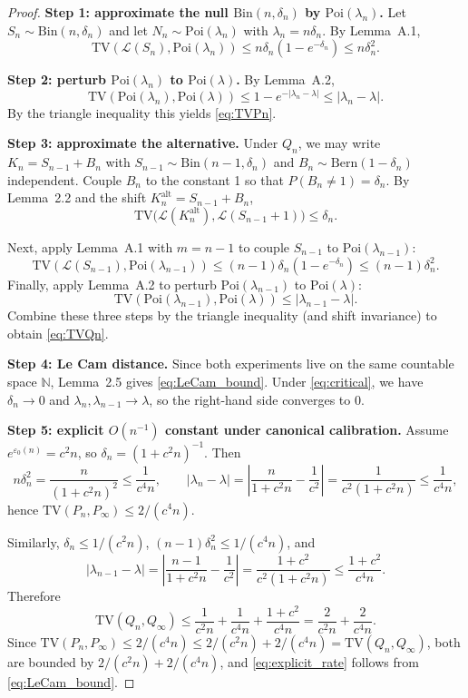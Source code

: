 \documentclass{article}
\begin{document}
\begin{proof}
\textbf{Step 1: approximate the null $\mathrm{Bin}(n, \delta_n)$ by $\mathrm{Poi}(\lambda_n)$.} Let $S_n \sim \mathrm{Bin}(n, \delta_n)$ and let
$N_n \sim \mathrm{Poi}(\lambda_n)$ with $\lambda_n = n\delta_n$. By Lemma~A.1,
\[
\mathrm{TV}(\mathcal{L}(S_n), \mathrm{Poi}(\lambda_n)) \leq n\delta_n(1 - e^{-\delta_n}) \leq n\delta_n^2.
\]

\textbf{Step 2: perturb $\mathrm{Poi}(\lambda_n)$ to $\mathrm{Poi}(\lambda)$.} By Lemma~A.2,
\[
\mathrm{TV}(\mathrm{Poi}(\lambda_n), \mathrm{Poi}(\lambda)) \leq 1 - e^{-|\lambda_n - \lambda|} \leq |\lambda_n - \lambda|.
\]
By the triangle inequality this yields \eqref{eq:TVPn}.

\textbf{Step 3: approximate the alternative.} Under $Q_n$, we may write $K_n = S_{n-1} + B_n$ with
$S_{n-1} \sim \mathrm{Bin}(n-1, \delta_n)$ and $B_n \sim \mathrm{Bern}(1 - \delta_n)$ independent. Couple $B_n$ to the constant 1 so that
$P(B_n \neq 1) = \delta_n$. By Lemma~2.2 and the shift $K_n^{\mathrm{alt}} = S_{n-1} + B_n$,
\[
\mathrm{TV}\bigl(\mathcal{L}(K_n^{\mathrm{alt}}), \mathcal{L}(S_{n-1} + 1)\bigr) \leq \delta_n.
\]

Next, apply Lemma~A.1 with $m = n-1$ to couple $S_{n-1}$ to $\mathrm{Poi}(\lambda_{n-1})$:
\[
\mathrm{TV}(\mathcal{L}(S_{n-1}), \mathrm{Poi}(\lambda_{n-1})) \leq (n-1)\delta_n(1 - e^{-\delta_n}) \leq (n-1)\delta_n^2.
\]
Finally, apply Lemma~A.2 to perturb $\mathrm{Poi}(\lambda_{n-1})$ to $\mathrm{Poi}(\lambda)$:
\[
\mathrm{TV}(\mathrm{Poi}(\lambda_{n-1}), \mathrm{Poi}(\lambda)) \leq |\lambda_{n-1} - \lambda|.
\]
Combine these three steps by the triangle inequality (and shift invariance) to obtain \eqref{eq:TVQn}.

\textbf{Step 4: Le Cam distance.} Since both experiments live on the same countable space $\mathbb{N}$,
Lemma~2.5 gives \eqref{eq:LeCam_bound}. Under \eqref{eq:critical}, we have $\delta_n \to 0$ and $\lambda_n, \lambda_{n-1} \to \lambda$, so the right-hand side
converges to 0.

\textbf{Step 5: explicit $O(n^{-1})$ constant under canonical calibration.} Assume $e^{\varepsilon_0(n)} = c^2 n$, so
$\delta_n = (1 + c^2 n)^{-1}$. Then
\[
n\delta_n^2 = \frac{n}{(1 + c^2 n)^2} \leq \frac{1}{c^4 n}, \qquad
|\lambda_n - \lambda| = \left|\frac{n}{1 + c^2 n} - \frac{1}{c^2}\right| = \frac{1}{c^2(1 + c^2 n)} \leq \frac{1}{c^4 n},
\]
hence $\mathrm{TV}(P_n, P_\infty) \leq 2/(c^4 n)$.

Similarly, $\delta_n \leq 1/(c^2 n)$, $(n-1)\delta_n^2 \leq 1/(c^4 n)$, and
\[
|\lambda_{n-1} - \lambda| = \left|\frac{n-1}{1 + c^2 n} - \frac{1}{c^2}\right| = \frac{1 + c^2}{c^2(1 + c^2 n)} \leq \frac{1 + c^2}{c^4 n}.
\]
Therefore
\[
\mathrm{TV}(Q_n, Q_\infty) \leq \frac{1}{c^2 n} + \frac{1}{c^4 n} + \frac{1 + c^2}{c^4 n} = \frac{2}{c^2 n} + \frac{2}{c^4 n}.
\]
Since $\mathrm{TV}(P_n, P_\infty) \leq 2/(c^4 n) \leq 2/(c^2 n) + 2/(c^4 n) = \mathrm{TV}(Q_n, Q_\infty)$, both are bounded by $2/(c^2 n) + 2/(c^4 n)$, and \eqref{eq:explicit_rate} follows from \eqref{eq:LeCam_bound}.
\end{proof}
\end{document}
